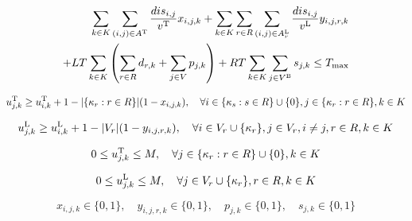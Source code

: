 \begin{linenomath}
    \begin{align}
        \sum_{k \in K}\sum_{(i,j) \in A^{\text{T}}} \frac{dis_{i,j}}{v^{\text{T}}} x_{i,j,k} + \sum_{k \in K}\sum_{r \in R}\sum_{(i,j) \in A_r^{\text{L}}} \frac{dis_{i,j}}{v^{\text{L}}} y_{i,j,r,k} \nonumber \\
        + LT\sum_{k \in K}\left(\sum_{r \in R}d_{r,k} + \sum_{j \in V}p_{j,k}\right) + RT\sum_{k \in K}\sum_{j \in V^{\text{B}}}s_{j,k} \leq T_{\max} \label{eq:time_budget}
    \end{align}
\end{linenomath}

\begin{linenomath}
    \begin{equation}
        u_{j,k}^{\text{T}} \geq u_{i,k}^{\text{T}} + 1 - |\{\kappa_r : r \in R\}|(1 - x_{i,j,k}), \quad \forall i \in \{\kappa_s : s \in R\} \cup \{0\}, j \in \{\kappa_r : r \in R\}, k \in K \label{eq:truck_subtour}
    \end{equation}
\end{linenomath}

\begin{linenomath}
    \begin{equation}
        u_{j,k}^{\text{L}} \geq u_{i,k}^{\text{L}} + 1 - |V_r|(1 - y_{i,j,r,k}), \quad \forall i \in V_r \cup \{\kappa_r\}, j \in V_r, i \neq j, r \in R, k \in K \label{eq:laborer_subtour}
    \end{equation}
\end{linenomath}

\begin{linenomath}
    \begin{equation}
        0 \leq u_{j,k}^{\text{T}} \leq M, \quad \forall j \in \{\kappa_r : r \in R\} \cup \{0\}, k \in K \label{eq:truck_aux_bounds}
    \end{equation}
\end{linenomath}

\begin{linenomath}
    \begin{equation}
        0 \leq u_{j,k}^{\text{L}} \leq M, \quad \forall j \in V_r \cup \{\kappa_r\}, r \in R, k \in K \label{eq:laborer_aux_bounds}
    \end{equation}
\end{linenomath}

\begin{linenomath}
    \begin{equation}
        x_{i,j,k} \in \{0,1\}, \quad y_{i,j,r,k} \in \{0,1\}, \quad p_{j,k} \in \{0,1\}, \quad s_{j,k} \in \{0,1\} \label{eq:binary_vars}
    \end{equation}
\end{linenomath}

